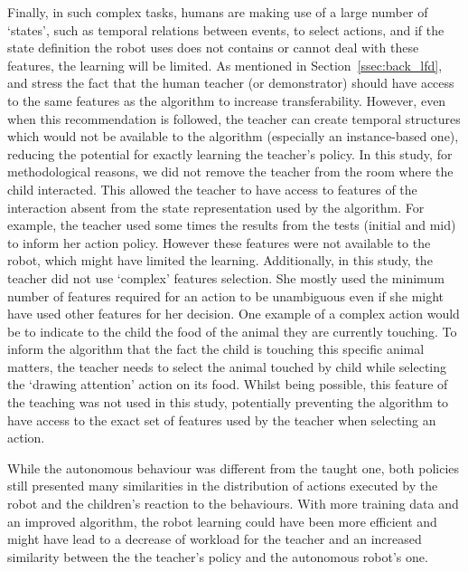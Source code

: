 Finally, in such complex tasks, humans are making use of a large number of `states', such as temporal relations between events, to select actions, and if the state definition the robot uses does not contains or cannot deal with these features, the learning will be limited. As mentioned in Section~\ref{ssec:back_lfd}, \cite{knox2014learning} and \cite{sequeira2016discovering} stress the fact that the human teacher (or demonstrator) should have access to the same features as the algorithm to increase transferability. However, even when this recommendation is followed, the teacher can create temporal structures which would not be available to the algorithm (especially an instance-based one), reducing the potential for exactly learning the teacher's policy. In this study, for methodological reasons, we did not remove the teacher from the room where the child interacted. This allowed the teacher to have access to features of the interaction absent from the state representation used by the algorithm. For example, the teacher used some times the results from the tests (initial and mid) to inform her action policy. However these features were not available to the robot, which might have limited the learning. Additionally, in this study, the teacher did not use `complex' features selection. She mostly used the minimum number of features required for an action to be unambiguous even if she might have used other features for her decision. One example of a complex action would be to indicate to the child the food of the animal they are currently touching. To inform the algorithm that the fact the child is touching this specific animal matters, the teacher needs to select the animal touched by child while selecting the `drawing attention' action on its food. Whilst being possible, this feature of the teaching was not used in this study, potentially preventing the algorithm to have access to the exact set of features used by the teacher when selecting an action.


While the autonomous behaviour was different from the taught one, both policies still presented many similarities in the distribution of actions executed by the robot and the children's reaction to the behaviours. With more training data and an improved algorithm, the robot learning could have been more efficient and might have lead to a decrease of workload for the teacher and an increased similarity between the the teacher's policy and the autonomous robot's one.

